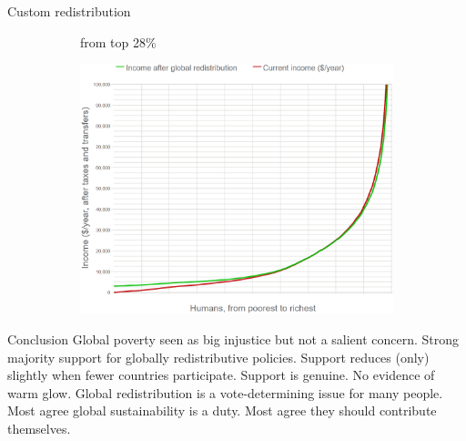 \documentclass[aspectratio=169,xcolor=dvipsnames, 11pt,mathserif]{beamer}
\begin{document}
\begin{frame}{Custom redistribution \href{run:survey_custom_redistr.mp4}{} \href{https://bit.ly/custom_redistr}{}}
{\begin{figure}
      \begin{subfigure}{.2\textwidth}
        \bbs \ip {}
        \ip {} from top 28\% 
        \ee
      \end{subfigure}\begin{subfigure}{.8\textwidth}
        \includegraphics[height=.8\textheight]{../figures/mean_custom_redistr/all_satisfied.png}
      \end{subfigure}
    \end{figure}}
\end{frame}

\begin{frame}{Conclusion}
\bbsp
\ip Global poverty seen as big injustice but not a salient concern.
\ip Strong majority support for globally redistributive policies.
\ip Support reduces (only) slightly when fewer countries participate.
\ip Support is genuine. No evidence of warm glow.
\ip Global redistribution is a vote-determining issue for many people. %
\ip Most agree global sustainability is a duty.
\ip Most agree they should contribute themselves.
\ee
\end{frame}
\end{document}
